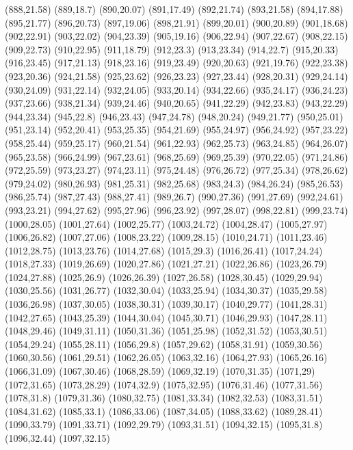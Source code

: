 (888,21.58)
(889,18.7)
(890,20.07)
(891,17.49)
(892,21.74)
(893,21.58)
(894,17.88)
(895,21.77)
(896,20.73)
(897,19.06)
(898,21.91)
(899,20.01)
(900,20.89)
(901,18.68)
(902,22.91)
(903,22.02)
(904,23.39)
(905,19.16)
(906,22.94)
(907,22.67)
(908,22.15)
(909,22.73)
(910,22.95)
(911,18.79)
(912,23.3)
(913,23.34)
(914,22.7)
(915,20.33)
(916,23.45)
(917,21.13)
(918,23.16)
(919,23.49)
(920,20.63)
(921,19.76)
(922,23.38)
(923,20.36)
(924,21.58)
(925,23.62)
(926,23.23)
(927,23.44)
(928,20.31)
(929,24.14)
(930,24.09)
(931,22.14)
(932,24.05)
(933,20.14)
(934,22.66)
(935,24.17)
(936,24.23)
(937,23.66)
(938,21.34)
(939,24.46)
(940,20.65)
(941,22.29)
(942,23.83)
(943,22.29)
(944,23.34)
(945,22.8)
(946,23.43)
(947,24.78)
(948,20.24)
(949,21.77)
(950,25.01)
(951,23.14)
(952,20.41)
(953,25.35)
(954,21.69)
(955,24.97)
(956,24.92)
(957,23.22)
(958,25.44)
(959,25.17)
(960,21.54)
(961,22.93)
(962,25.73)
(963,24.85)
(964,26.07)
(965,23.58)
(966,24.99)
(967,23.61)
(968,25.69)
(969,25.39)
(970,22.05)
(971,24.86)
(972,25.59)
(973,23.27)
(974,23.11)
(975,24.48)
(976,26.72)
(977,25.34)
(978,26.62)
(979,24.02)
(980,26.93)
(981,25.31)
(982,25.68)
(983,24.3)
(984,26.24)
(985,26.53)
(986,25.74)
(987,27.43)
(988,27.41)
(989,26.7)
(990,27.36)
(991,27.69)
(992,24.61)
(993,23.21)
(994,27.62)
(995,27.96)
(996,23.92)
(997,28.07)
(998,22.81)
(999,23.74)
(1000,28.05)
(1001,27.64)
(1002,25.77)
(1003,24.72)
(1004,28.47)
(1005,27.97)
(1006,26.82)
(1007,27.06)
(1008,23.22)
(1009,28.15)
(1010,24.71)
(1011,23.46)
(1012,28.75)
(1013,23.76)
(1014,27.68)
(1015,29.3)
(1016,26.41)
(1017,24.24)
(1018,27.33)
(1019,26.69)
(1020,27.86)
(1021,27.21)
(1022,26.86)
(1023,26.79)
(1024,27.88)
(1025,26.9)
(1026,26.39)
(1027,26.58)
(1028,30.45)
(1029,29.94)
(1030,25.56)
(1031,26.77)
(1032,30.04)
(1033,25.94)
(1034,30.37)
(1035,29.58)
(1036,26.98)
(1037,30.05)
(1038,30.31)
(1039,30.17)
(1040,29.77)
(1041,28.31)
(1042,27.65)
(1043,25.39)
(1044,30.04)
(1045,30.71)
(1046,29.93)
(1047,28.11)
(1048,29.46)
(1049,31.11)
(1050,31.36)
(1051,25.98)
(1052,31.52)
(1053,30.51)
(1054,29.24)
(1055,28.11)
(1056,29.8)
(1057,29.62)
(1058,31.91)
(1059,30.56)
(1060,30.56)
(1061,29.51)
(1062,26.05)
(1063,32.16)
(1064,27.93)
(1065,26.16)
(1066,31.09)
(1067,30.46)
(1068,28.59)
(1069,32.19)
(1070,31.35)
(1071,29)
(1072,31.65)
(1073,28.29)
(1074,32.9)
(1075,32.95)
(1076,31.46)
(1077,31.56)
(1078,31.8)
(1079,31.36)
(1080,32.75)
(1081,33.34)
(1082,32.53)
(1083,31.51)
(1084,31.62)
(1085,33.1)
(1086,33.06)
(1087,34.05)
(1088,33.62)
(1089,28.41)
(1090,33.79)
(1091,33.71)
(1092,29.79)
(1093,31.51)
(1094,32.15)
(1095,31.8)
(1096,32.44)
(1097,32.15)
